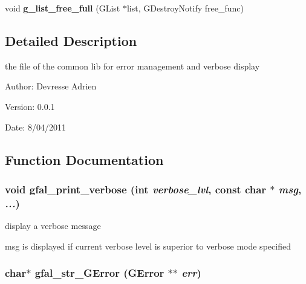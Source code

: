 \begin{CompactItemize}
\item 
void \textbf{g\_\-list\_\-free\_\-full} (GList $\ast$list, GDestroy\-Notify free\_\-func)\label{gfal__common__errverbose_8c_0d507092f75c2411862d210dbecbc4e5}

\end{CompactItemize}


\subsection{Detailed Description}
the file of the common lib for error management and verbose display 

\begin{Desc}
\item[Author:]Devresse Adrien \end{Desc}
\begin{Desc}
\item[Version:]0.0.1 \end{Desc}
\begin{Desc}
\item[Date:]8/04/2011 \end{Desc}


\subsection{Function Documentation}
\subsubsection{\setlength{\rightskip}{0pt plus 5cm}void gfal\_\-print\_\-verbose (int {\em verbose\_\-lvl}, const char $\ast$ {\em msg},  {\em ...})}\label{gfal__common__errverbose_8c_8b05640b4b43a776603bd93703c29d30}


display a verbose message 

msg is displayed if current verbose level is superior to verbose mode specified 
\subsubsection{\setlength{\rightskip}{0pt plus 5cm}char$\ast$ gfal\_\-str\_\-GError (GError $\ast$$\ast$ {\em err})}\label{gfal__common__errverbose_8c_c35c45ff43533cc6e7c176b0fa0b3128}


